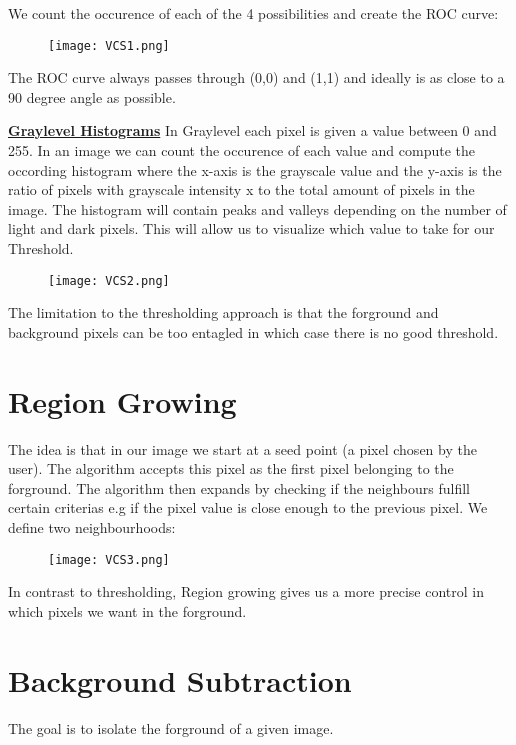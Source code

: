 \documentclass[8pt]{extreport}
\begin{document}
We count the occurence of each of the 4 possibilities and create the ROC curve:
\begin{figure}[H]
\centering
\texttt{[image: VCS1.png]}
\end{figure}
The ROC curve always passes through (0,0) and (1,1) and ideally is as close to a 90 degree angle as possible.

\underline{\textbf{Graylevel Histograms}} In Graylevel each pixel is given a value between 0 and 255. In an image we can count the occurence of each value and compute the occording histogram where the x-axis is the grayscale value and the y-axis is the ratio of pixels with grayscale intensity x to the total amount of pixels in the image. The histogram will contain peaks and valleys depending on the number of light and dark pixels. This will allow us to visualize which value to take for our Threshold. 
\begin{figure}[H]
\centering
\texttt{[image: VCS2.png]}
\end{figure}
The limitation to the thresholding approach is that the forground and background pixels can be too entagled in which case there is no good threshold.

\section{Region Growing} The idea is that in our image we start at a seed point (a pixel chosen by the user). The algorithm accepts this pixel as the first pixel  belonging to the forground. The algorithm then expands by checking if the neighbours fulfill certain criterias e.g if the pixel value is close enough to the previous pixel. We define two neighbourhoods:
\begin{figure}[H]
\centering
\texttt{[image: VCS3.png]}
\end{figure}
In contrast to thresholding, Region growing gives us a more precise control in which pixels we want in the forground.

\section{Background Subtraction} The goal is to isolate the forground of a given image.
\end{document}
